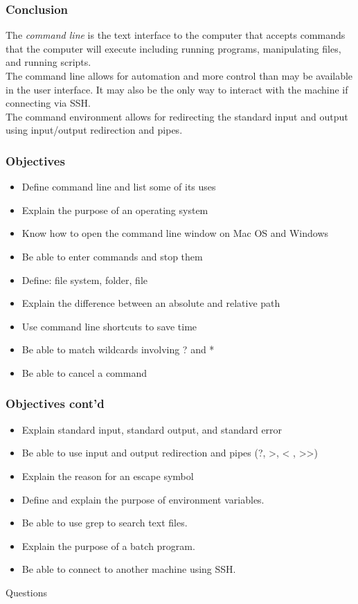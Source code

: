 \documentclass[xcolor=svgnames, colorlinks, handout]{beamer}
\newcommand{\nl}{\\[1em]}
\newcommand{\ft}[1]{\frametitle{#1}}
\begin{document}
\begin{frame}\ft{Conclusion}
The \emph{command line} is the text interface to the computer that accepts commands that the computer will execute including running programs, manipulating files, and running scripts.\nl

The command line allows for automation and more control than may be available in the user interface.  It may also be the only way to interact with the machine if connecting via SSH.\nl

The command environment allows for redirecting the standard input and output using input/output redirection and pipes.

\end{frame}

\begin{frame}\ft{Objectives}
\begin{itemize}
\item Define command line and list some of its uses
\item Explain the purpose of an operating system
\item Know how to open the command line window on Mac OS and Windows
\item Be able to enter commands and stop them
\item Define: file system, folder, file
\item Explain the difference between an absolute and relative path
\item Use command line shortcuts to save time
\item Be able to match wildcards involving ? and *
\item Be able to cancel a command
\end{itemize}

\end{frame}

\begin{frame}\ft{Objectives cont'd}
\begin{itemize}
\item Explain standard input, standard output, and standard error
\item Be able to use input and output redirection and pipes (?, >, < , >>)
\item Explain the reason for an escape symbol
\item Define and explain the purpose of environment variables.
\item Be able to use grep to search text files.
\item Explain the purpose of a batch program.
\item Be able to connect to another machine using SSH. 
\end{itemize}
\end{frame}


\begin{frame}
  {Questions}

  \nocite{lorem,ipsum}
  
  

\end{frame}
\end{document}
